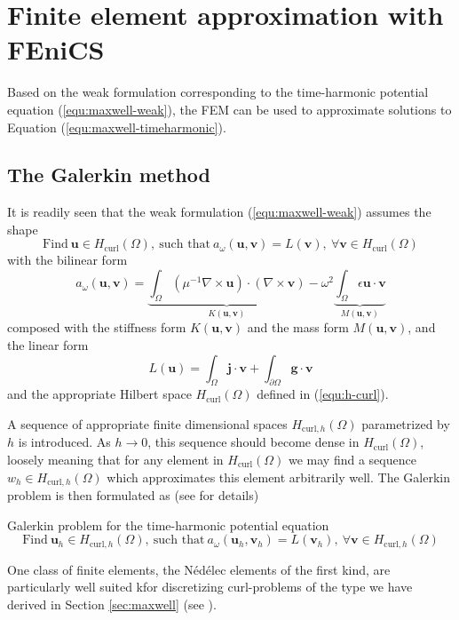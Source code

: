 \documentclass[11pt, a4paper]{article}
\begin{document}
\newpage
\section{Finite element approximation with FEniCS}
\label{sec:fem}

Based on the weak formulation corresponding to the time-harmonic potential equation
(\ref{equ:maxwell-weak}), the \acrfull{FEM} can be used to approximate solutions 
to Equation (\ref{equ:maxwell-timeharmonic}).

\subsection{The Galerkin method}
\label{subsec:fem-theory}

It is readily seen that the weak formulation (\ref{equ:maxwell-weak}) assumes the shape
\begin{equation}
    \text{Find}~\mathbf{u} \in H_{\textrm{curl}}(\Omega),~\text{such that}~a_{\omega}(\mathbf{u}, \mathbf{v}) = L(\mathbf{v}), ~\forall \mathbf{v} \in H_{\textrm{curl}}(\Omega)
\end{equation}
with the bilinear form 
\begin{equation}
    a_{\omega}(\mathbf{u}, \mathbf{v}) = \underbrace{\int_{\Omega} (\mu^{-1} \nabla \times \mathbf{u}) \cdot (\nabla \times \mathbf{v})}_{K(\mathbf{u}, \mathbf{v})}
    - \omega^2 \underbrace{\int_{\Omega} \epsilon \mathbf{u} \cdot \mathbf{v}}_{M(\mathbf{u}, \mathbf{v})} \label{equ:bilinear-form}
\end{equation}
composed with the stiffness form $K(\mathbf{u}, \mathbf{v})$ and the mass form $M(\mathbf{u}, \mathbf{v})$, and
the linear form 
\begin{equation}
    L(\mathbf{u}) = \int_{\Omega} \mathbf{j} \cdot \mathbf{v} + \int_{\partial \Omega} \mathbf{g} \cdot \mathbf{v} \label{equ:linear-form}
\end{equation}
and the appropriate Hilbert space $H_{\textrm{curl}}(\Omega)$ defined in (\ref{equ:h-curl}).

A sequence of appropriate finite dimensional spaces $H_{\textrm{curl}, h}(\Omega)$
parametrized by $h$ is introduced. As $h \to 0$, this sequence should become dense
in $H_{\textrm{curl}}(\Omega)$, loosely meaning that for any element in $H_{\textrm{curl}}(\Omega)$
we may find a sequence $w_h \in H_{\textrm{curl}, h}(\Omega)$ which approximates this
element arbitrarily well. The Galerkin problem is then formulated as
(see \cite{numapproxPDEs} for details)
\begin{fancybox}{Galerkin problem for the time-harmonic potential equation}
    \begin{equation}
        \text{Find}~\mathbf{u}_h \in H_{\textrm{curl},h}(\Omega),~\text{such that}~a_{\omega}(\mathbf{u}_h, \mathbf{v}_h) = L(\mathbf{v}_h), ~\forall \mathbf{v} \in H_{\textrm{curl}, h}(\Omega) \label{equ:galerkin-problem}
    \end{equation}
\end{fancybox}
One class of finite elements, the Nédélec elements of the first
kind, are particularly well suited kfor discretizing curl-problems of the type
we have derived in Section \ref{sec:maxwell} (see \cite{monk}).
\end{document}
